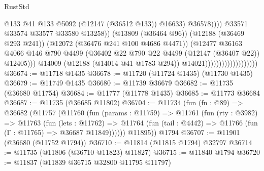 \begin{lexlean}{RustStd}
\begin{coremodule}
                                                          @133
                                                          @41
                                                          @133
                                                          @5092
                                                          (@12147 (@36512 @133))
                                                          @16633)
                                                        @36578))))
                                                @33571
                                                @33574
                                                @33577
                                                @33580
                                                @13258))
                                            (@13809 (@36464 @96))
                                            (@12188 (@36469 @293 @241))
                                            (@12072 (@36476 @241 @100 @4686 @4471))
                                            (@12477
                                              @36163
                                              @4066
                                              @146
                                              @790
                                              @4499
                                              (@36402
                                                @22
                                                @790
                                                @22
                                                @4499
                                                (@12147 (@36407 @22))
                                                @12405)))
                                          @14009
                                          (@12188 (@14014 @41 @1783 @294))
                                          @14021)))))))))))))))))))
@36674 := @11718 @1435
@36678 := @11720 (@11724 @1435) (@11730 @1435)
@36679 := @11749 @1435
@36680 := @11739 @36679
@36682 := @11735 (@36680 @11754)
@36684 := @11777 (@11778 @1435)
@36685 := @11773 @36684
@36687 := @11735 (@36685 @11802)
@36704 := @11734
    (fun (fn : @89) =>
    @36682
      (@11757
        (@11760
          (fun (params : @11759) =>
          @11761
            (fun (rty : @3982) =>
            @11763
              (fun (lets : @11762) =>
              @11764 (fun (tail : @4442) => @11766 (fun (Γ : @11765) => @36687 @11849))))))
        @11895))
    @1794
@36707 := @11901 (@36680 (@11752 @1794))
@36710 := @11814 (@11815 @1794) @32797
@36714 := @11735 (@11806 (@36710 @11823) @11827)
@36715 := @11840 @1794
@36720 := @11837 (@11839 @36715 @32800 @11795 @11797)

\end{coremodule}
\end{lexlean}
